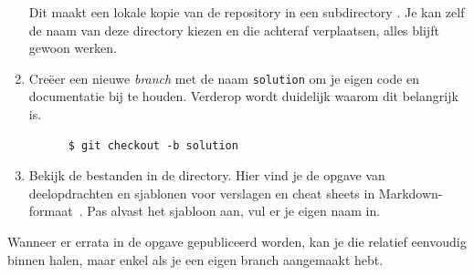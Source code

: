 \begin{enumerate}
  Dit maakt een lokale kopie van de repository in een subdirectory . Je kan zelf de naam van deze directory kiezen en die achteraf verplaatsen, alles blijft gewoon werken.
  
  \item Creëer een nieuwe \emph{branch} met de naam \texttt{solution} om je eigen code en documentatie bij te houden. Verderop wordt duidelijk waarom dit belangrijk is.

    \begin{verbatim}
      $ git checkout -b solution
    \end{verbatim}

  \item Bekijk de bestanden in de  directory. Hier vind je de opgave van deelopdrachten en sjablonen voor verslagen en cheat sheets in Markdown-formaat~\autocite{Gruber2004}. Pas alvast het sjabloon aan, vul er je eigen naam in.
\end{enumerate}

Wanneer er errata in de opgave gepubliceerd worden, kan je die relatief eenvoudig binnen halen, maar enkel als je een eigen branch aangemaakt hebt.

